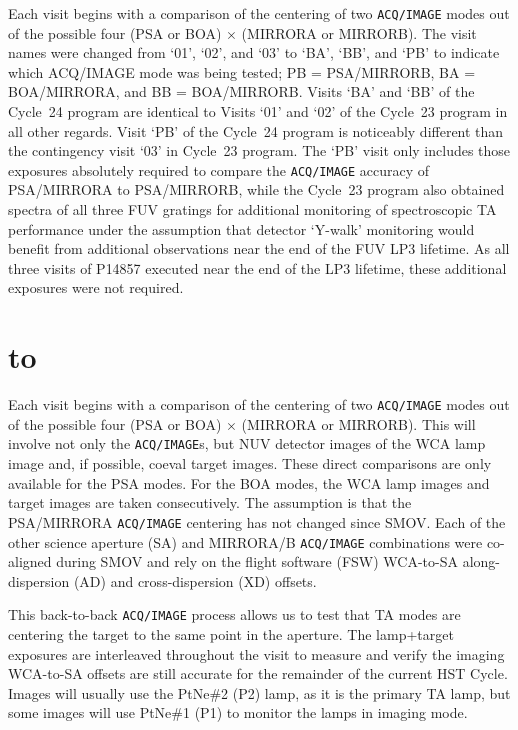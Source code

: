 \documentclass[12pt]{reportj}
\newcommand{\pid}[1]{{\rm P}#1}
\newcommand{\tacq}[1]{\texttt{ACQ/#1}}
\def\ssection#1{\addtocounter{section}{1} \setcounter{subsection}{0} \section*{\hbox to \hsize{\large\bf \arabic{section}. #1\hfill }}}
\begin{document}
Each visit begins with a comparison of the centering of two \tacq{IMAGE} modes out of the possible four (PSA or BOA) $\times$ (MIRRORA or MIRRORB). The visit names were changed from `01', `02', and `03' to `BA', `BB', and `PB' to indicate which ACQ/IMAGE mode was being tested; PB = PSA/MIRRORB, BA = BOA/MIRRORA, and BB = BOA/MIRRORB. Visits `BA' and `BB' of the Cycle~24 program are identical to Visits `01' and `02' of the Cycle~23 program in all other regards.
Visit `PB' of the Cycle~24 program is noticeably different than the contingency visit `03' in Cycle~23 program. The `PB' visit only includes those exposures absolutely required to compare the \tacq{IMAGE} accuracy of PSA/MIRRORA to PSA/MIRRORB, while the Cycle~23 program also obtained spectra of all three FUV gratings for additional monitoring of spectroscopic TA performance under the assumption that detector `Y-walk' monitoring would benefit from additional observations near the end of the FUV LP3 lifetime. As all three visits of \pid{14857} executed near the end of the LP3 lifetime, these additional exposures were not required.
\clearpage
\ssection{Program Structure \label{sec:structure}}
Each visit begins with a comparison of the centering of two \tacq{IMAGE} modes out of the possible four (PSA or BOA) $\times$ (MIRRORA or MIRRORB). This will involve not only the \tacq{IMAGE}s, but NUV detector images of the WCA lamp image and, if possible, coeval target images. These direct comparisons are only available for the PSA modes. For the BOA modes, the WCA lamp images and target images are taken consecutively. The assumption is that the PSA/MIRRORA \tacq{IMAGE} centering has not changed since SMOV. Each of the other science aperture (SA) and MIRRORA/B \tacq{IMAGE} combinations were co-aligned during SMOV and rely on the flight software
(FSW) WCA-to-SA along-dispersion (AD) and cross-dispersion (XD) offsets.

This back-to-back \tacq{IMAGE} process allows us to test that TA modes are centering the target to the same point in the aperture. The lamp+target exposures are interleaved throughout the visit to measure and verify the imaging WCA-to-SA offsets are still accurate for the remainder of the current HST Cycle. Images will usually use the PtNe\#2 (P2) lamp, as it is the primary TA lamp, but some images will use PtNe\#1 (P1) to monitor the lamps in imaging mode.
\end{document}
